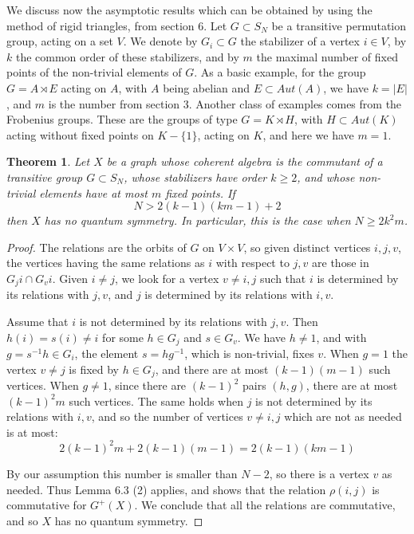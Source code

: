 \documentclass[11pt]{amsart}
\newtheorem{theorem}{Theorem}[section]
\begin{document}
We discuss now the asymptotic results which can be obtained by using the method of rigid triangles, from section 6. Let $G\subset S_N$ be a transitive permutation group, acting on a set $V$. We denote by $G_i\subset G$ the stabilizer of a vertex $i\in V$, by $k$ the common order of these stabilizers, and by $m$ the maximal number of fixed points of the non-trivial elements of $G$. As a basic example, for the group $G=A\rtimes E$ acting on $A$, with $A$ being abelian and $E\subset Aut(A)$, we have $k=|E|$, and $m$ is the number from section 3. Another class of examples comes from the Frobenius groups. These are the groups of type $G=K\rtimes H$, with $H\subset Aut(K)$ acting without fixed points on $K-\{1\}$, acting on $K$, and here we have $m=1$.

\begin{theorem}
Let $X$ be a graph whose coherent algebra is the commutant of a transitive group $G\subset S_N$, whose stabilizers have order $k\geq2$, and whose non-trivial elements have at most $m$ fixed points. If
$$N>2(k-1)(km-1)+2$$
then $X$ has no quantum symmetry. In particular, this is the case when $N\geq2k^2m$.
\end{theorem}

\begin{proof}
The relations are the orbits of $G$ on $V\times V$, so given distinct vertices $i,j,v$, the vertices having the same relations as $i$ with respect to $j,v$ are those in $G_ji\cap G_vi$. Given $i\neq j$, we look for a vertex $v\neq i,j$ such that $i$ is determined by its relations with $j,v$, and $j$ is determined by its relations with $i,v$.

Assume that $i$ is not determined by its relations with $j,v$. Then $h(i)=s(i)\neq i$ for some $h\in G_j$ and $s\in G_v$. We have $h\neq1$, and with $g=s^{-1}h\in G_i$, the element $s=hg^{-1}$, which is non-trivial, fixes $v$. When $g=1$ the vertex $v\neq j$ is fixed by $h\in G_j$, and there are at most $(k-1)(m-1)$ such vertices. When $g\neq1$, since there are $(k-1)^2$ pairs $(h,g)$, there are at most $(k-1)^2m$ such vertices. The same holds when $j$ is not determined by its relations with $i,v$, and so the number of vertices $v\neq i,j$ which are not as needed is at most:
$$2(k-1)^2m+2(k-1)(m-1)=2(k-1)(km-1)$$

By our assumption this number is smaller than $N-2$, so there is a vertex $v$ as needed. Thus Lemma 6.3 (2) applies, and shows that the relation $\rho(i,j)$ is commutative for $G^+(X)$. We conclude that all the relations are commutative, and so $X$ has no quantum symmetry.
\end{proof}
\end{document}
